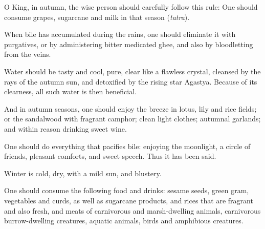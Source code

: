 \begin{translation}
\item[21cd--22ab] %
O King, in autumn, the wise person should carefully follow this rule:
One should consume grapes, sugarcane and milk in that season (\emph{tatra}).

\item[22cd--23ab] 
When bile has accumulated during the rains, one should eliminate it with purgatives, or by administering bitter medicated ghee, and also by bloodletting from the veins.

\item[23cd--24] %
Water should be tasty and cool, pure, clear like a flawless crystal, cleansed by the rays of the autumn sun, and detoxified by the rising star Agastya. Because of its clearness, all such water is then beneficial.

\item[25--26ab] %
And in autumn seasons, one should enjoy the breeze in lotus, lily and rice fields; or the sandalwood with fragrant camphor; clean light clothes; autumnal garlands; and within reason drinking sweet wine.

\item[26cd--27ab] %
One should do everything that pacifies bile: enjoying the moonlight, a circle of friends, pleasant comforts, and sweet speech. Thus it has been said.

\item[27cd] 
Winter is cold, dry, with a mild sun, and blustery.

\item[28--29] 
One should consume the following food and drinks: sesame seeds, green gram, vegetables and curds, as well as sugarcane products, and rices that are fragrant and also fresh, and meats of carnivorous and marsh-dwelling animals, carnivorous burrow-dwelling creatures, aquatic animals, birds and amphibious creatures.  


\end{translation}
